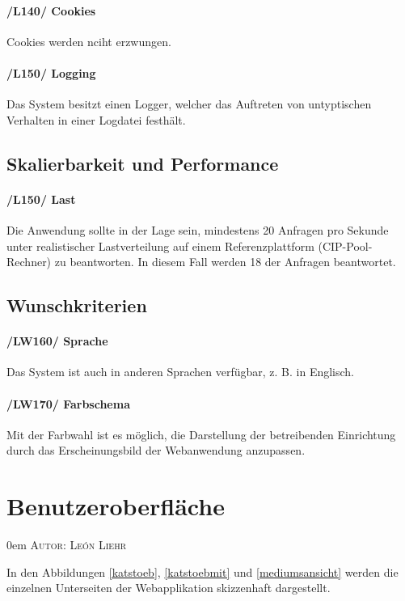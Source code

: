 \documentclass{article}
\makeatletter
\newcommand{\sectionauthor}[1]{
	{\parindent 0em \large \scshape Autor: #1 \par \nobreak \vspace*{2em}}
	\@afterheading
}
\makeatother
\begin{document}
   \paragraph{/L140/ \label{L140} Cookies}
   Cookies werden nciht erzwungen.

   \paragraph{/L150/ \label{L150} Logging}
    Das System besitzt einen Logger, welcher das Auftreten von untyptischen Verhalten in einer Logdatei festhält.

 \subsection{Skalierbarkeit und Performance}
	        \paragraph{
	        /L150/ \label{L150} Last}
	       Die Anwendung sollte in der Lage sein, mindestens 20 Anfragen pro Sekunde unter realistischer Lastverteilung auf einem Referenzplattform (CIP-Pool-Rechner) zu beantworten. In diesem Fall werden 18 der Anfragen beantwortet.


\subsection{Wunschkriterien}
	    \paragraph{/LW160/ \label{LW160} Sprache}
	    Das System ist auch in anderen Sprachen verfügbar, z. B. in Englisch.

\paragraph{/LW170/ \label{LW170} Farbschema}
	       Mit der Farbwahl ist es möglich, die Darstellung der betreibenden Einrichtung durch das Erscheinungsbild der Webanwendung anzupassen.

	   \section{Benutzeroberfläche} %
\sectionauthor{León Liehr}

In den Abbildungen \ref{katstoeb}, \ref{katstoebmit} und \ref{mediumsansicht} werden die einzelnen Unterseiten der Webapplikation skizzenhaft dargestellt.
\end{document}
